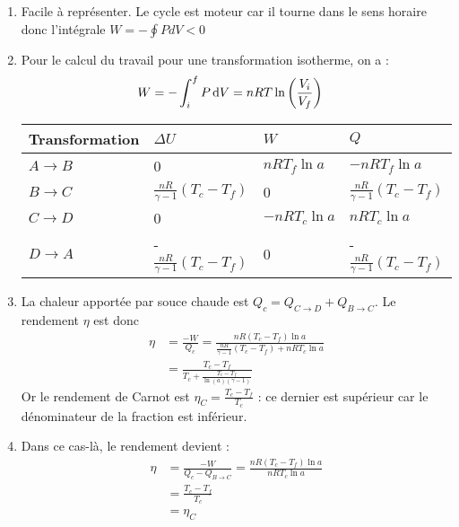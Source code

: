 \begin{correction}

\begin{enumerate}

	\item Facile à représenter. Le cycle est moteur car il tourne dans le sens horaire donc l'intégrale $W=-\oint PdV<0$

	\item Pour le calcul du travail pour une transformation isotherme, on a :
		\begin{align*}
	W = -\int_i^f P\mathop{}\!\mathrm{d} V &= nRT\ln\left(\frac{V_i}{V_f} \right) 
\end{align*}
	\begin{center}
\begin{tabular}{|p{}|p{3cm}|p{3cm}|p{3cm}|}
\hline
Transformation & $\Delta U$ & $W$ & $Q$ \\
\hline
$A\rightarrow B$ & 0  & $nRT_f\ln a$  & $-nRT_f\ln a$  \\
\hline
$B\rightarrow C$ & $\frac{nR}{\gamma-1}(T_c-T_f)$ & 0 & $\frac{nR}{\gamma-1}(T_c-T_f)$  \\
\hline
$C\rightarrow D$ & 0  & $-nRT_c\ln a$ & $nRT_c\ln a$ \\
\hline
$D\rightarrow A$ & -$\frac{nR}{\gamma-1}(T_c-T_f)$ & 0 & -$\frac{nR}{\gamma-1}(T_c-T_f)$ \\
\hline
\end{tabular}
\end{center}
	
	\item  La chaleur apportée par souce chaude est $Q_c=Q_{C\rightarrow D}+Q_{B\rightarrow C}$. Le rendement $\eta$ est donc
	\begin{align*}
		\eta&=\frac{-W}{Q_c}=\frac{nR(T_c-T_f)\ln a}{\frac{nR}{\gamma-1}(T_c-T_f)+nRT_c\ln a} \\
		&=\frac{T_c-T_f}{T_c+\frac{T_c-T_f}{\ln(a)(\gamma-1)}}
	\end{align*}
	Or le rendement de Carnot est $\eta_C=\frac{T_c-T_f}{T_c}$ : ce dernier est supérieur car le dénominateur de la fraction est inférieur.
	
	\item Dans ce cas-là, le rendement devient :
	\begin{align*}
		\eta&=\frac{-W}{Q_c-Q_{B\rightarrow C}}=\frac{nR(T_c-T_f)\ln a}{nRT_c\ln a} \\
		&=\frac{T_c-T_f}{T_c} \\
		&=\eta_C
	\end{align*}	
		
\end{enumerate}

\end{correction}

